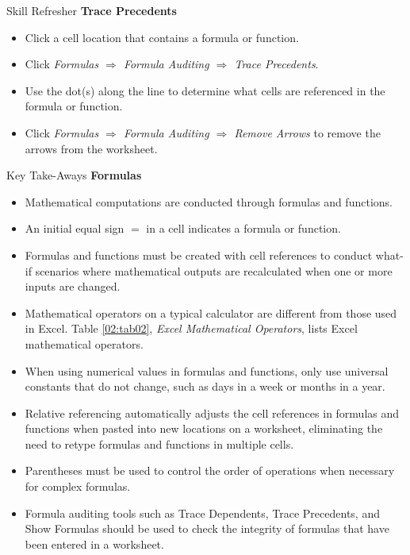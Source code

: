 \begin{center}
	\begin{sklbox}{Skill Refresher}
		\textbf{Trace Precedents}
		\\
		\begin{itemize}
			\setlength{\itemsep}{0pt}
			\setlength{\parskip}{0pt}
			\setlength{\parsep}{0pt}
			
			\item Click a cell location that contains a formula or function.
			\item Click \textit{Formulas $ \Rightarrow $ Formula Auditing $ \Rightarrow $ Trace Precedents}.
			\item Use the dot(s) along the line to determine what cells are referenced in the formula or function.
			\item Click \textit{Formulas $ \Rightarrow $ Formula Auditing $ \Rightarrow $ Remove Arrows} to remove the arrows from the worksheet.
			
		\end{itemize}
	\end{sklbox}
\end{center}

\begin{center}
	\begin{tkwbox}{Key Take-Aways}
		\textbf{Formulas}
		\\
		\begin{itemize}
			\setlength{\itemsep}{0pt}
			\setlength{\parskip}{0pt}
			\setlength{\parsep}{0pt}
			
			\item Mathematical computations are conducted through formulas and functions.
			\item An initial equal sign $ = $ in a cell indicates a formula or function.
			\item Formulas and functions must be created with cell references to conduct what-if scenarios where mathematical outputs are recalculated when one or more inputs are changed.
			\item Mathematical operators on a typical calculator are different from those used in Excel. Table \ref{02:tab02}, \textit{Excel Mathematical Operators}, lists Excel mathematical operators.
			\item When using numerical values in formulas and functions, only use universal constants that do not change, such as days in a week or months in a year.
			\item Relative referencing automatically adjusts the cell references in formulas and functions when pasted into new locations on a worksheet, eliminating the need to retype formulas and functions in multiple cells.
			\item Parentheses must be used to control the order of operations when necessary for complex formulas.
			\item Formula auditing tools such as Trace Dependents, Trace Precedents, and Show Formulas should be used to check the integrity of formulas that have been entered in a worksheet.
			
		\end{itemize}
	\end{tkwbox}
\end{center}

